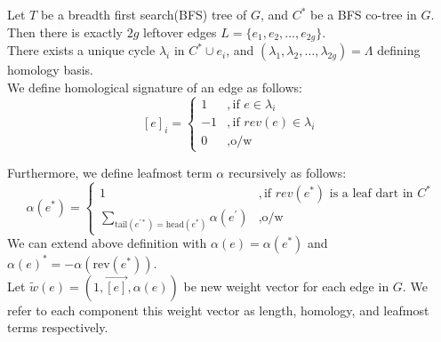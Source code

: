 \documentclass{article}
\begin{document}
Let $T$ be a breadth first search(BFS) tree of $G$, and $C^{*}$ be a BFS 
co-tree in $G$. Then there is exactly $2g$ leftover edges 
$L = \{e_1, e_2, \ldots, e_{2g}\}$. \\

There exists a unique cycle $\lambda_i$ in $C^{*} \cup {e_i}$, and $(\lambda_1, 
\lambda_2, \ldots, \lambda_{2g}) = \Lambda$ defining homology basis. \\
We define homological signature of an edge as follows:
\[ [e]_{i} = \begin{cases} 1 & ,\mbox{if } e \in \lambda_i \\
                          -1 & ,\mbox{if } rev(e) \in \lambda_i \\
                           0 & ,\mbox{o/w} \end{cases}\]

Furthermore, we define leafmost term $\alpha$ recursively as follows: \\
\[ \alpha(e^*) = 
  \begin{cases} 1 & ,\mbox{if } rev(e^*) \mbox{ is a leaf dart in } C^{*} \\
                           \sum \limits_{ \text{tail}(e^{'*})
                           = \text{head}(e^*) } \alpha(e^{'}) & ,
                           \mbox{o/w} \end{cases}\]
We can extend above definition with $\alpha(e) = \alpha(e^*)$ and 
  $\alpha(e)^* = - \alpha(\text{rev}(e^*))$. \\

Let $\tilde w(e) = ( 1, \vec{[e]}, \alpha(e) )$ be new
weight vector for each edge in $G$. We refer to each component this weight vector
as length, homology, and leafmost terms respectively.
\end{document}
